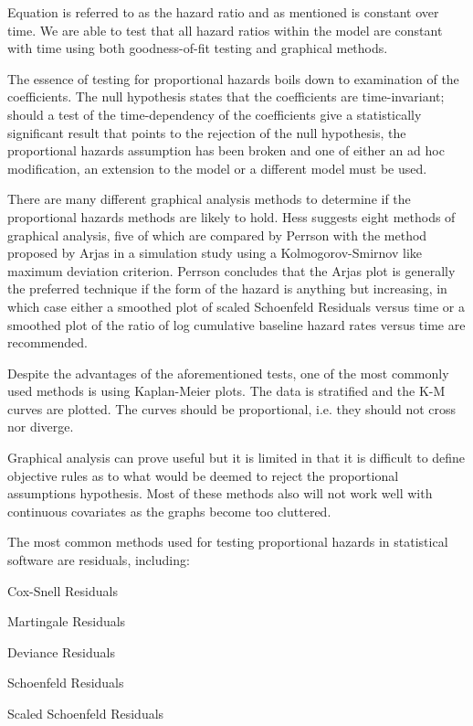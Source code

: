 Equation  is referred to as the hazard ratio and as mentioned is constant over time. We are able to test that all hazard ratios within the model are constant with time using both goodness-of-fit testing and graphical methods.

The essence of testing for proportional hazards boils down to examination of the coefficients. The null hypothesis states that the coefficients are time-invariant; should a test of the time-dependency of the coefficients give a statistically significant result that points to the rejection of the null hypothesis, the proportional hazards assumption has been broken and one of either an ad hoc modification, an extension to the model or a different model must be used.

There are many different graphical analysis methods to determine if the proportional hazards methods are likely to hold. Hess  suggests eight methods of graphical analysis, five of which are compared by Perrson  with the method proposed by Arjas  in a simulation study using a Kolmogorov-Smirnov like maximum deviation criterion. Perrson  concludes that the Arjas plot is generally the preferred technique if the form of the hazard is anything but increasing, in which case either a smoothed plot of scaled Schoenfeld Residuals versus time or a smoothed plot of the ratio of log cumulative baseline hazard rates versus time are recommended.

Despite the advantages of the aforementioned tests, one of the most commonly used methods is using Kaplan-Meier plots. The data is stratified and the K-M curves are plotted. The curves should be proportional, i.e. they should not cross nor diverge.  

Graphical analysis can prove useful but it is limited in that it is difficult to define objective rules as to what would be deemed to reject the proportional assumptions hypothesis. Most of these methods also will not work well with continuous covariates as the graphs become too cluttered.

The most common methods used for testing proportional hazards in statistical software are residuals, including:

\begin{itemize}
\begin{spacing}{0}
    \item Cox-Snell Residuals
    \item Martingale Residuals
    \item Deviance Residuals
    \item Schoenfeld Residuals
    \item Scaled Schoenfeld Residuals
\end{spacing}
\end{itemize}

